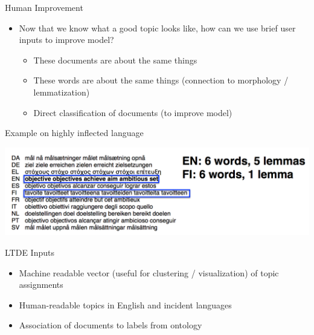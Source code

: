 \documentclass[compress]{beamer}
\begin{document}
              \begin{frame}{Human Improvement}

                \begin{itemize}
                  \item Now that we know what a good topic looks like,
                    how can we use brief user inputs to improve model?
                    \begin{itemize}
                      \item These documents are about the same things
                        \item These words are about the same things
                          (connection to morphology / lemmatization)
                          \item Direct classification of documents (to
                            improve model)
                    \end{itemize}
                \end{itemize}

              \end{frame}


              \begin{frame}{Example on highly inflected language}

                \includegraphics[width=1.0\linewidth]{multilingual_itm/morphology}

              \end{frame}

              \begin{frame}{LTDE Inputs}
                \begin{itemize}
                  \item Machine readable vector (useful for clustering
                    / visualization) of topic assignments
                  \item Human-readable topics in English and incident
                    languages
                  \item Association of documents to labels from ontology
                \end{itemize}

              \end{frame}
\end{document}
